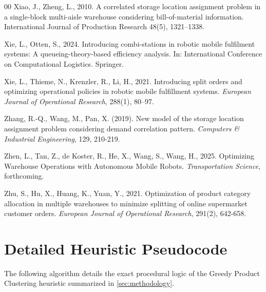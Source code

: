 \documentclass[preprint,review,11pt,authoryear]{elsarticle}
\begin{document}
\begin{thebibliography}{00}
Xiao, J., Zheng, L., 2010. A correlated storage location assignment problem in a single-block multi-aisle warehouse considering bill-of-material information. International Journal of Production Research 48(5), 1321--1338.

Xie, L., Otten, S., 2024. Introducing combi-stations in robotic mobile fulfilment systems: A queueing-theory-based efficiency analysis. In: International Conference on Computational Logistics. Springer.

Xie, L., Thieme, N., Krenzler, R., Li, H., 2021. Introducing split orders and optimizing operational policies in robotic mobile fulfillment systems. \textit{European Journal of Operational Research}, 288(1), 80--97.

Zhang, R.-Q., Wang, M., Pan, X. (2019).
New model of the storage location assignment problem considering demand correlation pattern.
\textit{Computers \& Industrial Engineering}, 129, 210-219.




Zhen, L., Tan, Z., de Koster, R., He, X., Wang, S., Wang, H., 2025. Optimizing Warehouse Operations with Autonomous Mobile Robots. \textit{Transportation Science}, forthcoming.

Zhu, S., Hu, X., Huang, K., Yuan, Y., 2021. Optimization of product category allocation in multiple warehouses to minimize splitting of online supermarket customer orders. \textit{European Journal of Operational Research}, 291(2), 642-658.

\end{thebibliography}
\newpage

\appendix
\section{Detailed Heuristic Pseudocode}
\label{sec:appendix_heuristic}

The following algorithm details the exact procedural logic of the Greedy Product Clustering heuristic summarized in \cref{sec:methodology}.
\end{document}
